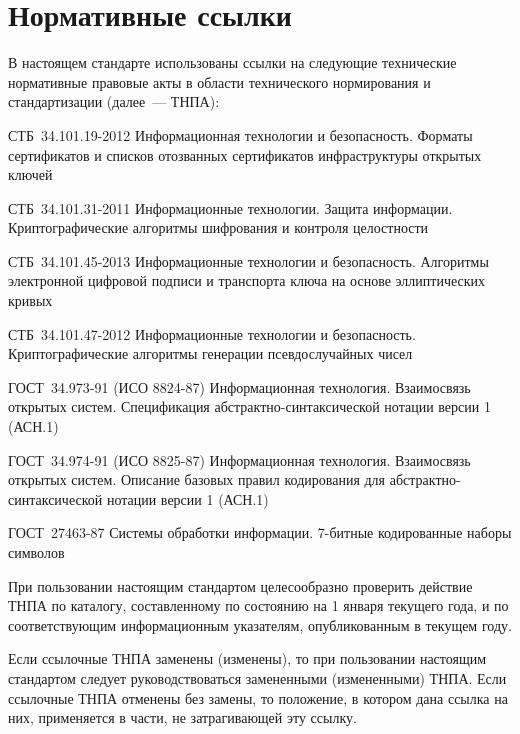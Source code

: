 \chapter{Нормативные ссылки}\label{REFS}

В настоящем стандарте использованы ссылки на следующие технические 
нормативные правовые акты в области технического нормирования и 
стандартизации (далее~--- ТНПА):  

СТБ~34.101.19-2012 Информационная технологии и безопасность. Форматы 
сертификатов и списков отозванных сертификатов инфраструктуры открытых 
ключей 

СТБ~34.101.31-2011 Информационные технологии. Защита информации. 
Криптографические алгоритмы шифрования и контроля целостности 

СТБ~34.101.45-2013 Информационные технологии и безопасность. Алгоритмы  
электронной цифровой подписи и транспорта ключа на основе эллиптических 
кривых 

СТБ~34.101.47-2012 Информационные технологии и безопасность. 
Криптографические алгоритмы генерации псевдослучайных чисел 

ГОСТ~34.973-91 (ИСО 8824-87) Информационная технология. Взаимосвязь 
открытых систем. Спецификация абстрактно-синтаксической нотации версии 1 
(АСН.1) 

ГОСТ~34.974-91 (ИСО 8825-87) Информационная технология. Взаимосвязь 
открытых систем. Описание базовых правил кодирования для 
абстрактно-синтаксической нотации версии 1 (АСН.1) 

ГОСТ~27463-87 Системы обработки информации. 7-битные кодированные наборы 
символов 

\begin{note*}
При пользовании настоящим стандартом целесообразно проверить действие ТНПА по
каталогу, составленному по состоянию на 1 января текущего года, и по
соответствующим информационным указателям, опубликованным в текущем году.

Если ссылочные ТНПА заменены (изменены), то при пользовании настоящим стандартом
следует руководствоваться замененными (измененными) ТНПА. Если ссылочные ТНПА
отменены без замены, то положение, в котором дана ссылка на них, применяется в
части, не затрагивающей эту ссылку.
\end{note*}

